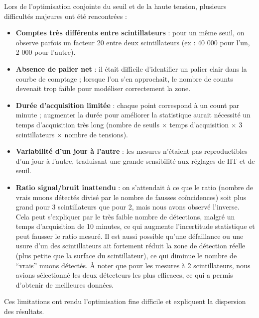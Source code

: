 \documentclass[a4paper,12pt,twoside]{article}
\begin{document}

\begin{center}
\begin{tcolorbox}[colback=red!5!white, colframe=red!80!black, title=Problèmes rencontrés lors de l'optimisation]
Lors de l’optimisation conjointe du seuil et de la haute tension, plusieurs difficultés majeures ont été rencontrées :
\begin{itemize}
    \item \textbf{Comptes très différents entre scintillateurs} : pour un même seuil, on observe parfois un facteur 20 entre deux scintillateurs (ex : 40 000 pour l’un, 2 000 pour l’autre).
    \item \textbf{Absence de palier net} : il était difficile d’identifier un palier clair dans la courbe de comptage ; lorsque l’on s’en approchait, le nombre de counts devenait trop faible pour modéliser correctement la zone.
    \item \textbf{Durée d’acquisition limitée} : chaque point correspond à un count par minute ; augmenter la durée pour améliorer la statistique aurait nécessité un temps d’acquisition très long (nombre de seuils $\times$ temps d’acquisition $\times$ 3 scintillateurs $\times$ nombre de tensions).
    \item \textbf{Variabilité d’un jour à l’autre} : les mesures n’étaient pas reproductibles d’un jour à l’autre, traduisant une grande sensibilité aux réglages de HT et de seuil.
    \item \textbf{Ratio signal/bruit inattendu} : on s’attendait à ce que le ratio (nombre de vrais muons détectés divisé par le nombre de fausses coïncidences) soit plus grand pour 3 scintillateurs que pour 2, mais nous avons observé l’inverse. Cela peut s’expliquer par le très faible nombre de détections, malgré un temps d’acquisition de 10 minutes, ce qui augmente l’incertitude statistique et peut fausser le ratio mesuré. Il est aussi possible qu’une défaillance ou une usure d'un des scintillateurs ait fortement réduit la zone de détection réelle (plus petite que la surface du scintillateur), ce qui diminue le nombre de “vrais” muons détectés. À noter que pour les mesures à 2 scintillateurs, nous avions sélectionné les deux détecteurs les plus efficaces, ce qui a permis d’obtenir de meilleures données.
\end{itemize}
Ces limitations ont rendu l’optimisation fine difficile et expliquent la dispersion des résultats.
\end{tcolorbox}
\end{center}
\end{document}

